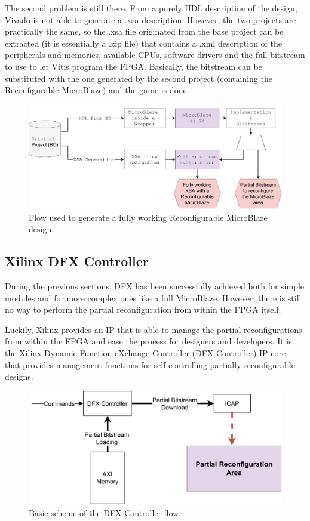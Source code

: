 The second problem is still there. From a purely HDL description of the design, Vivado is not able to generate a .xsa description. However, the two projects are practically the same, so the .xsa file originated from the base project can be extracted (it is essentially a .zip file) that contains a .xml description of the peripherals and memories, available CPUs, software drivers and the full bitstream to use to let Vitis program the FPGA. Basically, the bitstream can be substituted with the one generated by the second project (containing the Reconfigurable MicroBlaze) and the game is done.

\begin{figure}[H]
\centering
\includegraphics[width=1.0\linewidth]{images/chapter4/mystic_flow2.pdf}
\caption{Flow used to generate a fully working Reconfigurable MicroBlaze design.}
\label{fig:mystic_flow}
\end{figure}

\subsection{Xilinx DFX Controller}
During the previous sections, DFX has been successfully achieved both for simple modules and for more complex ones like a full MicroBlaze. However, there is still no way to perform the partial reconfiguration from within the FPGA itself. \bigskip

Luckily, Xilinx provides an IP that is able to manage the partial reconfigurations from within the FPGA and ease the process for designers and developers. It is the Xilinx Dynamic Function eXchange Controller (DFX Controller) IP core, that provides management functions for self-controlling partially reconfigurable designs. \bigskip

\begin{figure}[H]
\centering
\includegraphics[width=0.9\linewidth]{images/chapter4/dfxc.pdf}
\caption{Basic scheme of the DFX Controller flow.}
\end{figure}

